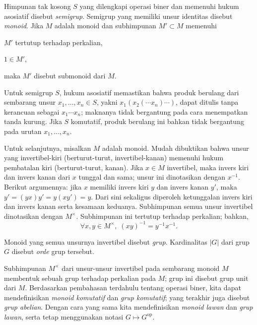 \begin{definition}\label{def:monoid}
	Himpunan tak kosong $S$ yang dilengkapi operasi biner dan memenuhi hukum asosiatif disebut \emph{semigrup}. Semigrup yang memiliki unsur identitas disebut \emph{monoid}. Jika $M$ adalah monoid dan subhimpunan $M' \subset M$ memenuhi
	\begin{inparaenum}[(i)]
		\item $M'$ tertutup terhadap perkalian,
		\item $1 \in M'$,
	\end{inparaenum}
	maka $M'$ disebut submonoid dari $M$.
\end{definition}

Untuk semigrup $S$, hukum asosiatif memastikan bahwa produk berulang dari sembarang unsur $x_1, \ldots, x_n \in S$, yakni $x_1(x_2(\cdots x_n)\cdots)$, dapat ditulis tanpa kerancuan sebagai $x_1 \cdots x_n$; maknanya tidak bergantung pada cara menempatkan tanda kurung. Jika $S$ komutatif, produk berulang ini bahkan tidak bergantung pada urutan $x_1,\ldots,x_n$.

Untuk selanjutnya, misalkan $M$ adalah monoid. Mudah dibuktikan bahwa unsur yang invertibel-kiri (berturut-turut, invertibel-kanan) memenuhi hukum pembatalan kiri (berturut-turut, kanan). Jika $x \in M$ invertibel, maka invers kiri dan invers kanan dari $x$ tunggal dan sama; unsur ini dinotasikan dengan $x^{-1}$. Berikut argumennya: jika $x$ memiliki invers kiri $y$ dan invers kanan $y'$, maka $y'=(yx)y'=y(xy')=y$. Dari sini sekaligus diperoleh ketunggalan invers kiri dan invers kanan serta kesamaan keduanya. Subhimpunan semua unsur invertibel dinotasikan dengan $M^\times$. Subhimpunan ini tertutup terhadap perkalian; bahkan,
\[ \forall x, y \in M^\times, \; (xy)^{-1} = y^{-1} x^{-1}. \]

\begin{definition}[Grup]\label{def:group}
	Monoid yang semua unsurnya invertibel disebut \emph{grup}. Kardinalitas $|G|$ dari grup $G$ disebut \emph{orde} grup tersebut.
\end{definition}

Subhimpunan $M^\times$ dari unsur-unsur invertibel pada sembarang monoid $M$ membentuk sebuah grup terhadap perkalian pada $M$; grup ini disebut grup unit dari $M$. Berdasarkan pembahasan terdahulu tentang operasi biner, kita dapat mendefinisikan \emph{monoid komutatif} dan \emph{grup komutatif}; yang terakhir juga disebut \emph{grup abelian}. Dengan cara yang sama kita mendefinisikan \emph{monoid lawan} dan \emph{grup lawan}, serta tetap menggunakan notasi $G \mapsto G^\text{op}$.

